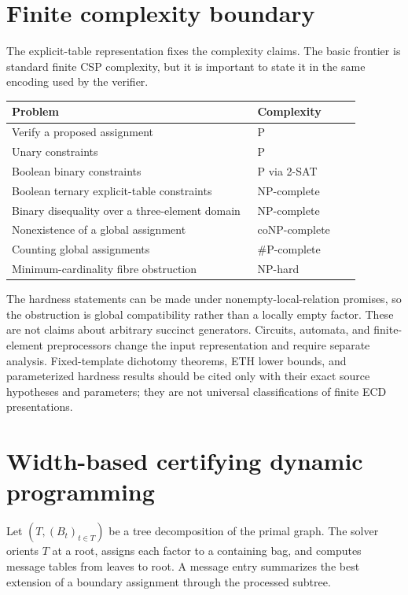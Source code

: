 \documentclass[11pt]{article}
\theoremstyle{plain}
\theoremstyle{definition}
\theoremstyle{remark}
\begin{document}
\section{Finite complexity boundary}
\label{sec:complexity}

The explicit-table representation fixes the complexity claims.  The basic
frontier is standard finite CSP complexity, but it is important to state it in
the same encoding used by the verifier.

\begin{center}
\begin{tabular}{@{}p{0.62\linewidth}p{0.26\linewidth}@{}}
\toprule
Problem & Complexity\\
\midrule
Verify a proposed assignment & P\\
Unary constraints & P\\
Boolean binary constraints & P via 2-SAT\\
Boolean ternary explicit-table constraints & NP-complete\\
Binary disequality over a three-element domain & NP-complete\\
Nonexistence of a global assignment & coNP-complete\\
Counting global assignments & \(\#\mathrm P\)-complete\\
Minimum-cardinality fibre obstruction & NP-hard\\
\bottomrule
\end{tabular}
\end{center}

The hardness statements can be made under nonempty-local-relation promises, so
the obstruction is global compatibility rather than a locally empty factor.
These are not claims about arbitrary succinct generators.  Circuits, automata,
and finite-element preprocessors change the input representation and require
separate analysis.  Fixed-template dichotomy theorems, ETH lower bounds, and
parameterized hardness results should be cited only with their exact source
hypotheses and parameters; they are not universal classifications of finite ECD
presentations.

\section{Width-based certifying dynamic programming}
\label{sec:width-dp}

Let \((T,(B_t)_{t\in T})\) be a tree decomposition of the primal graph.  The
solver orients \(T\) at a root, assigns each factor to a containing bag, and
computes message tables from leaves to root.  A message entry summarizes the
best extension of a boundary assignment through the processed subtree.
\end{document}
